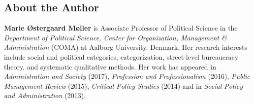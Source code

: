\subsection{About the Author}
\label{paper3:colophon}

\textbf{Marie Østergaard Møller} is Associate Professor of Political Science in the \textit{Department of Political Science, Center for Organization, Management \& Administration} (COMA) at Aalborg University, Denmark. Her research interests include social and political categories, categorization, street-level bureaucracy theory, and systematic qualitative methods. Her work has appeared in \textit{Administration and Society}  (2017), \textit{Profession and Professionalism}  (2016), \textit{Public Management Review}  (2015), \textit{Critical Policy Studies}  (2014) and in \textit{Social Policy and Administration}  (2013). 